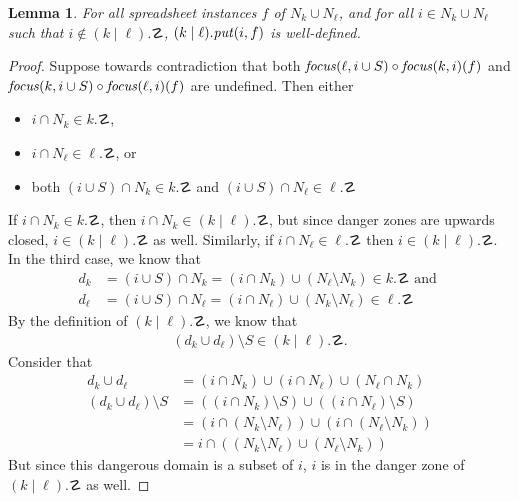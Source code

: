 \documentclass{article}
\newtheorem{lemma}{Lemma}
\begin{document}
\begin{lemma}
    For all spreadsheet instances $f$ of $N_k \cup N_\ell$, and
    for all $i \in N_k \cup N_\ell$ such that $i \not\in (k\mid\ell).\danger$,
    $(k\mid\ell).\mathit{put}(i,f)$ is well-defined.
\end{lemma}
\begin{proof}
    Suppose towards contradiction that both 
    $\mathit{focus}(\ell,i\cup S) \circ \mathit{focus}(k,i)(f)$
    and $\mathit{focus}(k,i\cup S) \circ \mathit{focus}(\ell,i)(f)$ are undefined. 
    Then either
    \begin{itemize}
        \item $i \cap N_k \in k.\danger$,
        \item $i \cap N_\ell \in \ell.\danger$, or
        \item both $(i \cup S) \cap N_k \in k.\danger$ and $(i \cup S) \cap N_\ell \in \ell.\danger$ 
    \end{itemize}
    If $i \cap N_k \in k.\danger$, then $i \cap N_k \in (k\mid\ell).\danger$,
    but since danger zones are upwards closed, $i \in (k\mid\ell).\danger$ as well.
    Similarly, if $i \cap N_\ell \in \ell.\danger$ then $i \in (k\mid\ell).\danger$.
    In the third case, we know that
    \begin{align*}
        d_k &= (i \cup S) \cap N_k = (i \cap N_k) \cup (N_\ell \setminus N_k) \in k.\danger \text{ and }\\
        d_\ell &= (i \cup S) \cap N_\ell = (i \cap N_\ell) \cup (N_k \setminus N_\ell) \in \ell.\danger
    \end{align*}
    By the definition of $(k\mid\ell).\danger$, we know that
    \begin{align*}
        (d_k \cup d_\ell) \setminus S \in (k\mid\ell).\danger.
    \end{align*}
    Consider that
    \begin{align*}
        d_k \cup d_\ell &= (i \cap N_k) \cup (i \cap N_\ell) \cup (N_\ell \cap N_k) \\
        (d_k \cup d_\ell) \setminus S &= ((i \cap N_k) \setminus S) \cup ((i \cap N_\ell) \setminus S) \\
        &= (i \cap (N_k \setminus N_\ell)) \cup (i \cap (N_\ell \setminus N_k)) \\
        &= i \cap ((N_k \setminus N_\ell) \cup (N_\ell \setminus N_k))
    \end{align*}
    But since this dangerous domain is a subset of $i$, $i$ is in the danger 
    zone of $(k\mid\ell).\danger$ as well.
\end{proof}
\end{document}
